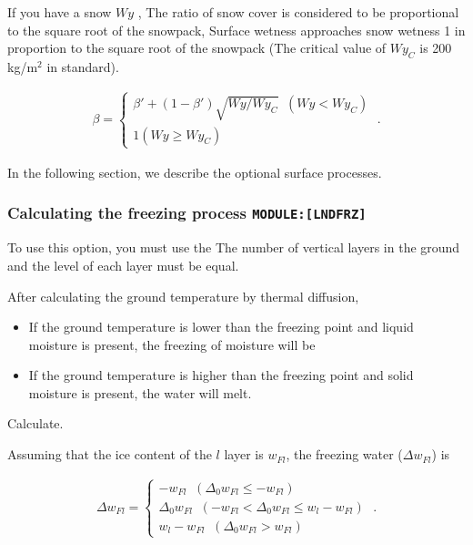 If you have a snow \(Wy\) , The ratio of snow cover is considered to be
proportional to the square root of the snowpack, Surface wetness
approaches snow wetness 1 in proportion to the square root of the
snowpack (The critical value of \(Wy_C\) is 200 kg/m\(^2\) in standard).

\begin{eqnarray}
  \beta = \left\{ 
  \begin{array}{ll}
    \beta' + (1-\beta')\sqrt{Wy/Wy_{C}}  \;\;   (Wy < Wy_{C}) \\
    1                                           (Wy \ge Wy_{C})
  \end{array}
  \right. \; .
\end{eqnarray}

In the following section, we describe the optional surface processes.

\hypertarget{calculating-the-freezing-process-modulelndfrz}{%
\subsubsection{\texorpdfstring{Calculating the freezing process
\texttt{MODULE:{[}LNDFRZ{]}}}{Calculating the freezing process MODULE:{[}LNDFRZ{]}}}\label{calculating-the-freezing-process-modulelndfrz}}

To use this option, you must use the The number of vertical layers in
the ground and the level of each layer must be equal.

After calculating the ground temperature by thermal diffusion,

\begin{itemize}
\item
  If the ground temperature is lower than the freezing point and liquid
  moisture is present, the freezing of moisture will be
\item
  If the ground temperature is higher than the freezing point and solid
  moisture is present, the water will melt.
\end{itemize}

Calculate.

Assuming that the ice content of the \(l\) layer is \(w_{Fl}\), the
freezing water (\(\Delta w_{Fl}\)) is

\begin{eqnarray}
  \Delta w_{Fl} = \left\{
    \begin{array}{ll}
      - w_{Fl}
         \;\; ( \Delta_0 w_{Fl} \le - w_{Fl} ) \\
      \Delta_0 w_{Fl}
         \;\; ( - w_{Fl} < \Delta_0 w_{Fl} \le w_l - w_{Fl} ) \\
      w_l - w_{Fl}
         \;\; ( \Delta_0 w_{Fl} >  w_{Fl} )
    \end{array}
  \right. \; .
\end{eqnarray}

